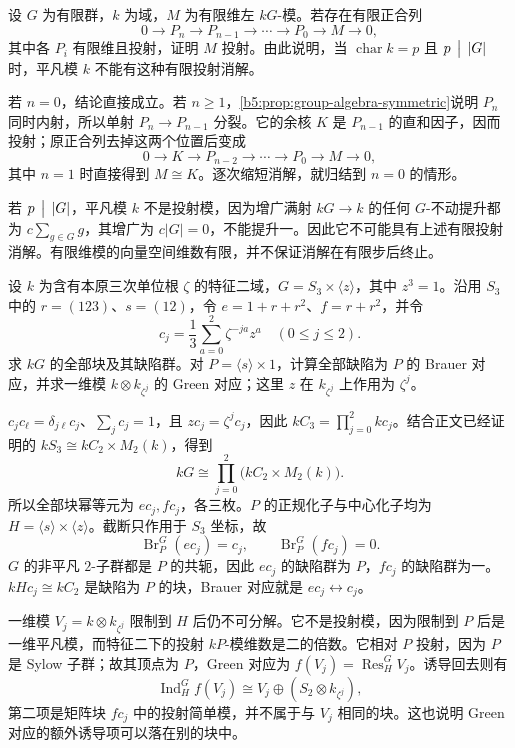 \begin{optionalexercise}\label{b5:ex:08-finite-projective-resolution}
	设 \(G\) 为有限群，\(k\) 为域，\(M\) 为有限维左 \(kG\)-模。若存在有限正合列
	\[
		0\longrightarrow P_n\longrightarrow P_{n-1}\longrightarrow\cdots
		\longrightarrow P_0\longrightarrow M\longrightarrow0,
	\]
	其中各 \(P_i\) 有限维且投射，证明 \(M\) 投射。由此说明，当 \(\operatorname{char}k=p\) 且 \(p\,\bigm\vert\,|G|\) 时，平凡模 \(k\) 不能有这种有限投射消解。
\end{optionalexercise}
\begin{solution}
	若 \(n=0\)，结论直接成立。若 \(n\ge1\)，\cref{b5:prop:group-algebra-symmetric}说明 \(P_n\) 同时内射，所以单射 \(P_n\to P_{n-1}\) 分裂。它的余核 \(K\) 是 \(P_{n-1}\) 的直和因子，因而投射；原正合列去掉这两个位置后变成
	\[
		0\longrightarrow K\longrightarrow P_{n-2}\longrightarrow\cdots
		\longrightarrow P_0\longrightarrow M\longrightarrow0,
	\]
	其中 \(n=1\) 时直接得到 \(M\cong K\)。逐次缩短消解，就归结到 \(n=0\) 的情形。

	若 \(p\,\bigm\vert\,|G|\)，平凡模 \(k\) 不是投射模，因为增广满射 \(kG\to k\) 的任何 \(G\)-不动提升都为 \(c\sum_{g\in G}g\)，其增广为 \(c|G|=0\)，不能提升一。因此它不可能具有上述有限投射消解。有限维模的向量空间维数有限，并不保证消解在有限步后终止。
\end{solution}

\begin{optionalexercise}\label{b5:ex:08-product-brauer-correspondence}
	设 \(k\) 为含有本原三次单位根 \(\zeta\) 的特征二域，\(G=S_3\times\langle z\rangle\)，其中 \(z^3=1\)。沿用 \(S_3\) 中的 \(r=(123)\)、\(s=(12)\)，令 \(e=1+r+r^2\)、\(f=r+r^2\)，并令
	\[
		c_j=\frac13\sum_{a=0}^2\zeta^{-ja}z^a\quad(0\le j\le2).
	\]
	求 \(kG\) 的全部块及其缺陷群。对 \(P=\langle s\rangle\times1\)，计算全部缺陷为 \(P\) 的 Brauer 对应，并求一维模 \(k\otimes k_{\zeta^j}\) 的 Green 对应；这里 \(z\) 在 \(k_{\zeta^j}\) 上作用为 \(\zeta^j\)。
\end{optionalexercise}
\begin{solution}
	\(c_jc_\ell=\delta_{j\ell}c_j\)、\(\sum_jc_j=1\)，且 \(zc_j=\zeta^jc_j\)，因此 \(kC_3=\prod_{j=0}^2kc_j\)。结合正文已经证明的 \(kS_3\cong kC_2\times M_2(k)\)，得到
	\[
		kG\cong\prod_{j=0}^2\bigl(kC_2\times M_2(k)\bigr).
	\]
	所以全部块幂等元为 \(ec_j,fc_j\)，各三枚。\(P\) 的正规化子与中心化子均为 \(H=\langle s\rangle\times\langle z\rangle\)。截断只作用于 \(S_3\) 坐标，故
	\[
		\operatorname{Br}_P^G(ec_j)=c_j,\qquad
		\operatorname{Br}_P^G(fc_j)=0.
	\]
	\(G\) 的非平凡 \(2\)-子群都是 \(P\) 的共轭，因此 \(ec_j\) 的缺陷群为 \(P\)，\(fc_j\) 的缺陷群为一。\(kHc_j\cong kC_2\) 是缺陷为 \(P\) 的块，Brauer 对应就是 \(ec_j\leftrightarrow c_j\)。

	一维模 \(V_j=k\otimes k_{\zeta^j}\) 限制到 \(H\) 后仍不可分解。它不是投射模，因为限制到 \(P\) 后是一维平凡模，而特征二下的投射 \(kP\)-模维数是二的倍数。它相对 \(P\) 投射，因为 \(P\) 是 Sylow 子群；故其顶点为 \(P\)，Green 对应为 \(f(V_j)=\operatorname{Res}_H^G V_j\)。诱导回去则有
	\[
		\operatorname{Ind}_H^G f(V_j)
		\cong V_j\oplus(S_2\otimes k_{\zeta^j}),
	\]
	第二项是矩阵块 \(fc_j\) 中的投射简单模，并不属于与 \(V_j\) 相同的块。这也说明 Green 对应的额外诱导项可以落在别的块中。
\end{solution}

